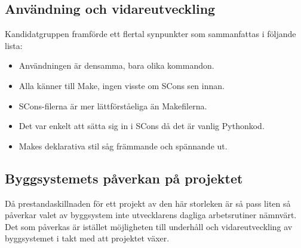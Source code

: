 \FloatBarrier

\subsection{Användning och vidareutveckling}
Kandidatgruppen framförde ett flertal synpunkter som sammanfattas i följande lista:

\begin{itemize}
  \item Användningen är densamma, bara olika kommandon.
  \item Alla känner till Make, ingen visste om SCons sen innan.
  \item SCons-filerna är mer lättförståeliga än Makefilerna.
  \item Det var enkelt att sätta sig in i SCons då det är vanlig Pythonkod.
  \item Makes deklarativa stil såg främmande och spännande ut.
\end{itemize}

\subsection{Byggsystemets påverkan på projektet}
Då prestandaskillnaden för ett projekt av den här storleken är så pass liten så påverkar valet av byggsystem inte utvecklarens dagliga arbetsrutiner nämnvärt. Det som påverkas är istället möjligheten till underhåll och vidareutveckling av byggsystemet i takt med att projektet växer. 
